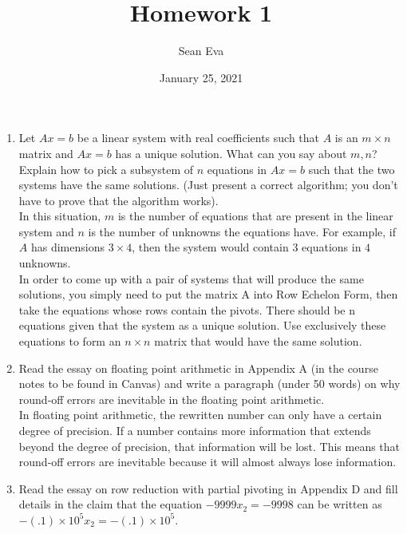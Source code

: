 \documentclass{article}
\title{Homework 1}
\author{Sean Eva}
\date{January 25, 2021}
\begin{document}
\maketitle

\begin{enumerate}
    \item Let $Ax = b$ be a linear system with real coefficients such that $A$ is an $m \times n$ matrix and $Ax = b$ has a unique solution.
    What can you say about $m, n$?
    Explain how to pick a subsystem of $n$ equations in $Ax = b$ such that the two systems have the same solutions.
    (Just present a correct algorithm; you don’t have to prove that the algorithm works).\\
    
    In this situation, $m$ is the number of equations that are present in the linear system and $n$ is the number of unknowns the equations have. For example, if $A$ has dimensions $3 \times 4$, then the system would contain $3$ equations in $4$ unknowns.\\
    In order to come up with a pair of systems that will produce the same solutions, you simply need to put the matrix A into Row Echelon Form, then take the equations whose rows contain the pivots. There should be n equations given that the system as a unique solution. Use exclusively these equations to form an $n\times n$ matrix that would have the same solution.\\
    
    \item Read the essay on floating point arithmetic in Appendix A (in the course notes to be found in Canvas) and write a paragraph (under 50 words) on why round-off errors are inevitable in the floating point arithmetic.\\
    
    In floating point arithmetic, the rewritten number can only have a certain degree of precision. If a number contains more information that extends beyond the degree of precision, that information will be lost. This means that round-off errors are inevitable because it will almost always lose information.\\
    
    \item Read the essay on row reduction with partial pivoting in Appendix D and fill details in the claim that the equation $-9999x_2 = -9998$ can be written as $-(.1) \times 10^5x_2 = -(.1) \times 10^5$.\\
    

\end{enumerate}
\end{document}
